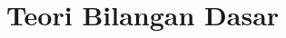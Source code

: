 \documentclass[12pt, letter]{scrartcl}
\begin{document}
\title{Teori Bilangan Dasar}


    
    
    
    




\end{document}
